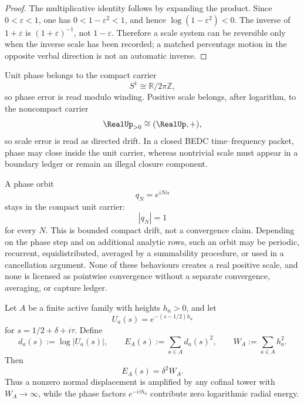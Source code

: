 \begin{proof}
The multiplicative identity follows by expanding the product.  Since
$0<\varepsilon<1$, one has $0<1-\varepsilon^2<1$, and hence
$\log(1-\varepsilon^2)<0$.  The inverse of $1+\varepsilon$ is
$(1+\varepsilon)^{-1}$, not $1-\varepsilon$.  Therefore a scale system
can be reversible only when the inverse scale has been recorded; a
matched percentage motion in the opposite verbal direction is not an
automatic inverse.
\end{proof}

\begin{principle}
\label{prin:unified-reality-phase-compactness-scale-ledger}
Unit phase belongs to the compact carrier
$$
S^1\cong\mathbb R/2\pi\mathbb Z,
$$
so phase error is read modulo winding.  Positive scale belongs, after
logarithm, to the noncompact carrier
$$
\RealUp_{>0}\cong(\RealUp,+),
$$
so scale error is read as directed drift.  In a closed BEDC
time--frequency packet, phase may close inside the unit carrier, whereas
nontrivial scale must appear in a boundary ledger or remain an illegal
closure component.
\end{principle}

\begin{principle}
\label{prin:unified-reality-compact-phase-drift-not-pointwise-convergence}
A phase orbit
$$
q_N=e^{iN\alpha}
$$
stays in the compact unit carrier:
$$
|q_N|=1
$$
for every $N$.  This is bounded compact drift, not a convergence claim.
Depending on the phase step and on additional analytic rows, such
an orbit may be periodic, recurrent, equidistributed, averaged by a
summability procedure, or used in a cancellation argument.  None of
these behaviours creates a real positive scale, and none is licensed as
pointwise convergence without a separate convergence, averaging, or
capture ledger.
\end{principle}

\begin{corollary}
\label{cor:unified-reality-scale-amplifies-phase-radial-unit}
Let $A$ be a finite active family with heights $h_a>0$, and let
$$
U_a(s)=e^{-(s-1/2)h_a}
$$
for $s=1/2+\delta+i\tau$.  Define
$$
d_a(s):=\log |U_a(s)|,
\qquad
E_A(s):=\sum_{a\in A}d_a(s)^2,
\qquad
W_A:=\sum_{a\in A}h_a^2.
$$
Then
$$
E_A(s)=\delta^2W_A.
$$
Thus a nonzero normal displacement is amplified by any cofinal tower
with $W_A\to\infty$, while the phase factors $e^{-i\tau h_a}$ contribute
zero logarithmic radial energy.
\end{corollary}

